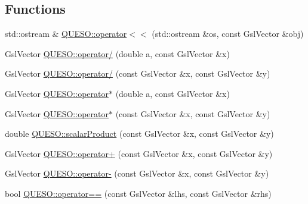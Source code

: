 \subsection*{Functions}
\begin{DoxyCompactItemize}
\item 
std\-::ostream \& \hyperlink{namespace_q_u_e_s_o_a25bb97988816bba6f17d35884da60512}{Q\-U\-E\-S\-O\-::operator$<$$<$} (std\-::ostream \&os, const Gsl\-Vector \&obj)
\item 
Gsl\-Vector \hyperlink{namespace_q_u_e_s_o_a583c7692c136ba44beb81f031d8d55fc}{Q\-U\-E\-S\-O\-::operator/} (double a, const Gsl\-Vector \&x)
\item 
Gsl\-Vector \hyperlink{namespace_q_u_e_s_o_ac34d69017fbfb253ed76d20ef53c6f81}{Q\-U\-E\-S\-O\-::operator/} (const Gsl\-Vector \&x, const Gsl\-Vector \&y)
\item 
Gsl\-Vector \hyperlink{namespace_q_u_e_s_o_ac6209b9b8dde0c23a8d7a239eabcc6b5}{Q\-U\-E\-S\-O\-::operator$\ast$} (double a, const Gsl\-Vector \&x)
\item 
Gsl\-Vector \hyperlink{namespace_q_u_e_s_o_adc8f40b553602f8f0e9668d30af42ebe}{Q\-U\-E\-S\-O\-::operator$\ast$} (const Gsl\-Vector \&x, const Gsl\-Vector \&y)
\item 
double \hyperlink{namespace_q_u_e_s_o_a159769395a413f58b974587d5f43bbc7}{Q\-U\-E\-S\-O\-::scalar\-Product} (const Gsl\-Vector \&x, const Gsl\-Vector \&y)
\item 
Gsl\-Vector \hyperlink{namespace_q_u_e_s_o_a4b74ebe52de00d2ea6affde322a158bc}{Q\-U\-E\-S\-O\-::operator+} (const Gsl\-Vector \&x, const Gsl\-Vector \&y)
\item 
Gsl\-Vector \hyperlink{namespace_q_u_e_s_o_ae873227c9725013266467750e1fbad72}{Q\-U\-E\-S\-O\-::operator-\/} (const Gsl\-Vector \&x, const Gsl\-Vector \&y)
\item 
bool \hyperlink{namespace_q_u_e_s_o_a18841f416975b3d80dfefa99a9ad0c15}{Q\-U\-E\-S\-O\-::operator==} (const Gsl\-Vector \&lhs, const Gsl\-Vector \&rhs)
\end{DoxyCompactItemize}
